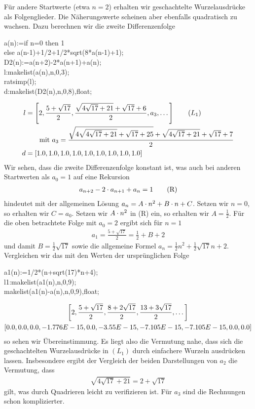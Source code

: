 \documentclass[11pt,a4paper]{article}
\begin{document}
Für andere Startwerte (etwa $n=2$) erhalten wir geschachtelte Wurzelausdrücke
als Folgenglieder. Die Näherungswerte scheinen aber ebenfalls quadratisch zu
wachsen.  Dazu berechnen wir die zweite Differenzenfolge
\begin{code}
  a(n):=if n=0 then 1\\
  else a(n-1)+1/2+1/2*sqrt(8*a(n-1)+1);\\[4pt]
  D2(n):=a(n+2)-2*a(n+1)+a(n);\\[4pt]

  l:makelist(a(n),n,0,3);\\
  ratsimp(l);\\
  d:makelist(D2(n),n,0,8),float;
\end{code}
\begin{align*}
  l&=\left[2,\frac{5+\sqrt{17}}{2},
    \frac{\sqrt{4\sqrt{17} + 21} + \sqrt{17} + 6}{2}, a_3,\dots\right]\tag{$L_1$}\\
  &\qquad \text{mit}\
  a_3=\frac{\sqrt{4\sqrt{4\sqrt{17} + 21}+\sqrt{17}+25} + \sqrt{4\sqrt{17} + 21}
      + \sqrt{17} + 7}{2}\\
  d&=\left[1.0, 1.0, 1.0, 1.0, 1.0, 1.0, 1.0, 1.0, 1.0\right] 
\end{align*}
Wir sehen, dass die zweite Differenzenfolge konstant ist, was auch bei anderen
Startwerten als $a_0=1$ auf eine Rekursion 
\begin{gather*}
  a_{n+2}-2\cdot a_{n+1}+a_n=1\tag{R}
\end{gather*}
hindeutet mit der allgemeinen Lösung $a_n=A\cdot n^2+B\cdot n+C$.  Setzen wir $n=0$,
so erhalten wir $C=a_0$.  Setzen wir $A\cdot n^2$ in (R) ein, so erhalten wir
$A=\frac12$.  Für die oben betrachtete Folge mit $a_0=2$ ergibt sich für $n=1$
\begin{gather*}
  a_1=\frac{5+\sqrt{17}}{2}=\frac12+B+2 
\end{gather*}
und damit $B=\frac12\sqrt{17}$ sowie die allgemeine Formel $a_n=\frac12
n^2+\frac12\sqrt{17} n+2$. Vergleichen wir das mit den Werten der
ursprünglichen Folge 
\begin{code}
  a1(n):=1/2*(n+sqrt(17)*n+4);\\[4pt]
  l1:makelist(a1(n),n,0,9);\\
  makelist(a1(n)-a(n),n,0,9),float;
\end{code}
\begin{gather*}
  \left[2,\frac{5+\sqrt{17}}{2},\frac{8+2\sqrt{17}}{2},\frac{13+3\sqrt{17}}{2},\dots\right]\\  
  \left[0.0, 0.0, 0.0, - 1.776E-15, 0.0, - 3.55E-15, - 7.105E-15, - 7.105E-15,
    0.0, 0.0\right]
\end{gather*}
so sehen wir Übereinstimmung. Es liegt also die Vermutung nahe, dass sich die
geschachtelten Wurzelausdrücke in $(L_1)$ durch einfachere Wurzeln ausdrücken
lassen.  Insbesondere ergibt der Vergleich der beiden Darstellungen von $a_2$
die Vermutung, dass 
\begin{gather*}
  \sqrt{4\sqrt{17} + 21}=2+\sqrt{17}
\end{gather*}
gilt, was durch Quadrieren leicht zu verifizieren ist.  Für $a_3$ sind die
Rechnungen schon komplizierter.
\end{document}
